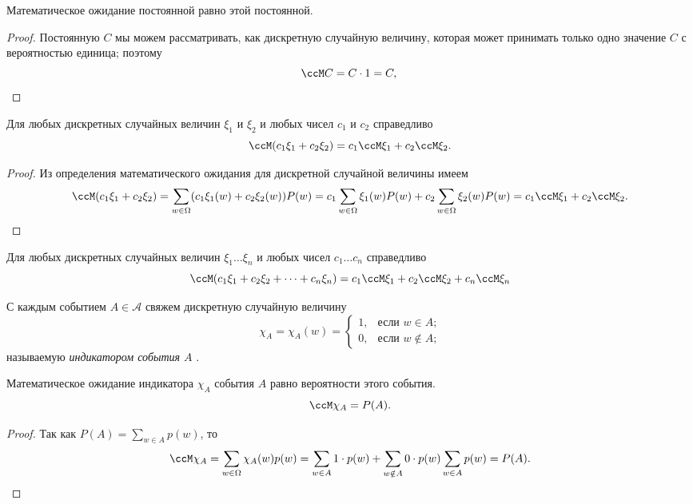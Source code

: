 \begin{thm}\label{thm1}
Математическое ожидание постоянной равно этой постоянной.
\end{thm}
\begin{proof}
Постоянную $C$ мы можем рассматривать, как дискретную случайную величину, которая может принимать только одно значение $C$ с вероятностью единица; поэтому
\begin{equation*}
\ccM C = C\cdot1=C, \qedhere
\end{equation*}
\end{proof}
\begin{thm}[линейность] Для любых дискретных случайных величин $\xi_1$ и $\xi_2$ и любых чисел $c_1$ и $c_2$ справедливо
\begin{equation}
\ccM(c_1\xi_1+c_2\xi_2) = c_1\ccM\xi_1+c_2\ccM\xi_2.
\end{equation}
\end{thm}
\begin{proof}
Из определения математического ожидания для дискретной случайной величины имеем
$$
\ccM (c_1\xi_1+c_2\xi_2)=\sum\limits_{w\in\Omega}(c_1\xi_1(w)+c_2\xi_2(w))P(w) = c_1\sum\limits_{w\in\Omega}\xi_1(w) P(w)+c_2\sum\limits_{w\in\Omega}\xi_2(w) P(w)=c_1\ccM\xi_1+c_2\ccM\xi_2.
$$
\end{proof}

\begin{cons} Для любых дискретных случайных величин $\xi_1\dots\xi_n$ и любых чисел $c_1\dots c_n$ справедливо
$$
\ccM(c_1\xi_1+c_2\xi_2+\dots+c_n\xi_n) = c_1\ccM\xi_1+c_2\ccM\xi_2+c_n\ccM\xi_n
$$
\end{cons}


\begin{defn}
С каждым событием $A \in \mathcal{A}$ свяжем дискретную случайную величину
$$
\chi_A =\chi_A(w)=\begin{cases}
1,&\text{если $w \in A$;}\\
0,&\text{если $w \notin A$;}
\end{cases}
$$
называемую \textit{индикатором события $A$} .
\end{defn}

\begin{thm}
Математическое ожидание индикатора $\chi_A$ события $A$ равно вероятности этого события.
$$
\ccM\chi_A=P(A).
$$ 
\end{thm}
\begin{proof}
Так как $P(A)=\sum\limits_{w\in A}p(w)$, то 
$$
\ccM\chi_A=\sum\limits_{w\in\Omega}\chi_A(w)p(w)=\sum\limits_{w\in A}1\cdot p(w)+\sum\limits_{w\notin A}0\cdot p(w)\sum\limits_{w\in A}p(w)=P(A).
$$
\end{proof}


